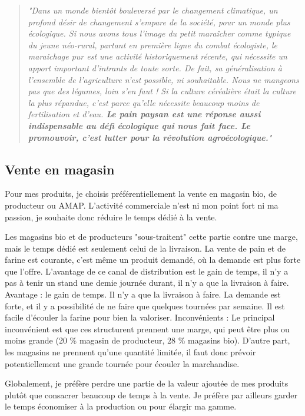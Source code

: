 \documentclass{book}
\begin{document}
\begin{quote}

\textit{"Dans un monde bientôt bouleversé par le changement climatique, un profond désir de changement s’empare de la société, pour un monde plus écologique. Si nous avons tous l’image du petit maraîcher comme typique du jeune néo-rural, partant en première ligne du combat écologiste, le maraichage pur est une activité historiquement récente, qui nécessite un apport important d’intrants de toute sorte. De fait, sa généralisation à l’ensemble de l’agriculture n’est possible, ni souhaitable. Nous ne mangeons pas que des légumes, loin s’en faut ! Si la culture céréalière était la culture la plus répandue, c’est parce qu’elle nécessite beaucoup moins de fertilisation et d’eau. \textbf{Le pain paysan est une réponse aussi indispensable au défi écologique qui nous fait face. Le promouvoir, c'est lutter pour la révolution agroécologique.}"}

\end{quote}

\subsection{Vente en magasin}

Pour mes produits, je choisis préférentiellement la vente en magasin bio, de producteur ou AMAP. L’activité commerciale n’est ni mon point fort ni ma passion, je souhaite donc réduire le temps dédié à la vente. 

Les magasins bio et de producteurs "sous-traitent" cette partie contre une marge, mais le temps dédié est seulement celui de la livraison. La vente de pain et de farine est courante, c’est même un produit demandé, où la demande est plus forte que l’offre. L’avantage de ce canal de distribution est le gain de temps, il n’y a pas à tenir un stand une demie journée durant, il n’y a que la livraison à faire. 
Avantage : le gain de temps. Il n’y a que la livraison à faire. La demande est forte, et il y a possibilité de ne faire que quelques tournées par semaine. Il est facile d’écouler la farine pour bien la valoriser. 
Inconvénients : Le principal inconvénient est que ces structurent prennent une marge, qui peut être plus ou moins grande (20 \% magasin de producteur, 28 \% magasins bio). D’autre part, les magasins ne prennent qu’une quantité limitée, il faut donc prévoir potentiellement une grande tournée pour écouler la marchandise.

Globalement, je préfère perdre une partie de la valeur ajoutée de mes produits plutôt que consacrer beaucoup de temps à la vente. Je préfère par ailleurs garder le temps économiser à la production ou pour élargir ma gamme. 
\end{document}
